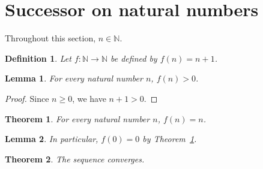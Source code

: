 \documentclass{article}
\newtheorem{definition}{Definition}
\newtheorem{theorem}{Theorem}
\newtheorem{lemma}{Lemma}
\begin{document}
\section{Successor on natural numbers}
Throughout this section, $n\in\mathbb{N}$.

\begin{definition}\label{successor}
Let $f:\mathbb{N}\to\mathbb{N}$ be defined by $f(n)=n+1$.
\end{definition}

\begin{lemma}\label{successor_positive}
For every natural number $n$, $f(n)>0$.
\end{lemma}
\begin{proof}
Since $n\geq 0$, we have $n+1>0$.
\end{proof}

\begin{theorem}\label{successor_identity}
For every natural number $n$, $f(n)=n$.
\end{theorem}

\begin{lemma}\label{identity_consequence}
In particular, $f(0)=0$ by Theorem~\ref{successor_identity}.
\end{lemma}

\begin{theorem}\label{ambiguous}
The sequence converges.
\end{theorem}
\end{document}
